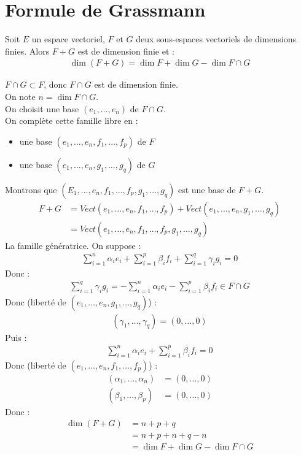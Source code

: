 \documentclass[../main.tex]{subfiles}
\begin{document}
\section{Formule de Grassmann}
\begin{tcolorbox}[title=Théorème 22.23, title filled=false, colframe=orange, colback=orange!10!white]
    Soit $E$ un espace vectoriel, $F$ et $G$ deux sous-espaces vectoriels de dimensions finies. Alors $F + G$ est de dimension finie et : 
    \begin{align*}
        \dim(F+G) = \dim F + \dim G - \dim F \cap G
    \end{align*}
\end{tcolorbox}

\noindent $F \cap G \subset F$, donc $F \cap G$ est de dimension finie. \\
On note $n = \dim F \cap G$. \\
On choisit une base $(e_1, \ldots, e_n)$ de $F \cap G$. \\
On complète cette famille libre en :
\begin{itemize}
    \item une base $(e_1, \ldots, e_n, f_1, \ldots, f_p)$ de $F$
    \item une base $(e_1, \ldots, e_n, g_1, \ldots, g_q)$ de $G$
\end{itemize}
Montrons que $(E_1, \ldots, e_n, f_1, \ldots, f_p, g_1, \ldots, g_q)$ est une base de $F+G$. \\
\begin{align*}
    F + G &= Vect(e_1, \ldots, e_n, f_1, \ldots, f_p) + Vect(e_1, \ldots, e_n, g_1, \ldots, g_q) \\
    &= Vect(e_1, \ldots, e_n, f_1, \ldots, f_p, g_1, \ldots, g_q)
\end{align*}
La famille génératrice. 
On suppose : 
\begin{align*}
    \sum_{i=1}^{n} \alpha_i e_i + \sum_{i=1}^{p} \beta_i f_i + \sum_{i=1}^{q} \gamma_i g_i = 0
\end{align*}
Donc : 
\begin{align*}
    \sum_{i=1}^{q} \gamma_i g_i = -\sum_{i=1}^{n} \alpha_i e_i - \sum_{i=1}^{p} \beta_i f_i \in F \cap G
\end{align*}
Donc (liberté de $(e_1, \ldots, e_n, g_1, \ldots, g_q)$) : 
\begin{align*}
    (\gamma_1, \ldots, \gamma_q) = (0, \ldots, 0)
\end{align*}
Puis : 
\begin{align*}
    \sum_{i=1}^{n} \alpha_i e_i + \sum_{i=1}^{p} \beta_i f_i = 0
\end{align*}
Donc (liberté de $(e_1, \ldots, e_n, f_1, \ldots, f_p)$) : 
\begin{align*}
    (\alpha_1, \ldots, \alpha_n) &= (0, \ldots, 0) \\
    (\beta_1, \ldots, \beta_p) &= (0, \ldots, 0)
\end{align*}
Donc : 
\begin{align*}
    \dim (F + G) &= n + p + q \\
    &= n + p + n + q - n \\
    &= \dim F + \dim G - \dim F \cap G
\end{align*}
\end{document}

